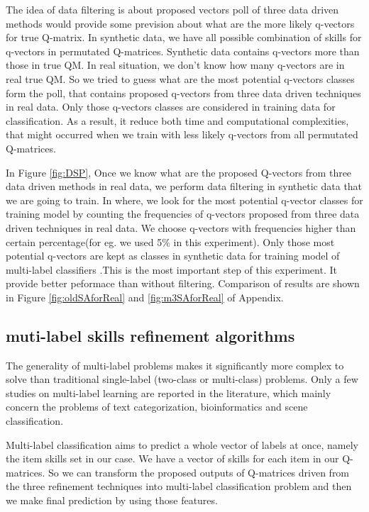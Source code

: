 \documentclass[12pt]{article}
\begin{document}
The idea of data filtering is about proposed vectors poll of three data driven methods would provide some prevision about what are the more likely q-vectors for true Q-matrix. In synthetic data, we have all possible combination of skills for q-vectors in permutated Q-matrices. Synthetic data contains q-vectors more than those in true QM. In real situation, we don't know how many q-vectors are in real true QM. So we tried to guess what are the most potential q-vectors classes form the poll, that contains proposed q-vectors from three data driven techniques in real data. Only those q-vectors classes are considered in training data for classification. As a result, it reduce both time and computational complexities, that might occurred when we train with less likely q-vectors from all permutated Q-matrices.   



In Figure \ref{fig:DSP}, Once we know what are the proposed Q-vectors from three data driven methods in real data, we perform data filtering in synthetic data that we are going to train. In where, we look for the most potential q-vector classes for training model by counting the frequencies of q-vectors proposed from three data driven techniques in real data. We choose q-vectors with frequencies higher than certain percentage(for eg. we used 5\% in this experiment). Only those most potential q-vectors are kept as classes in synthetic data for training model of multi-label classifiers .This is the most important step of this experiment. It provide better peformace than without filtering. Comparison of results are shown in Figure \ref{fig:oldSAforReal} and \ref{fig:m3SAforReal}  of Appendix. 


  



\subsection{muti-label skills refinement algorithms}

The generality of multi-label problems makes it significantly more complex to solve than traditional single-label (two-class or multi-class) problems. Only a few studies on multi-label learning are reported in the literature, which mainly concern the problems of text categorization, bioinformatics and scene classification. 

Multi-label classification aims to predict a whole vector of labels at once, namely the item skills set in our case. We have a vector of skills for each item in our Q-matrices. So we can transform the proposed outputs of Q-matrices driven from the three refinement techniques into multi-label classification problem and then we make final prediction by using those features.
\end{document}
